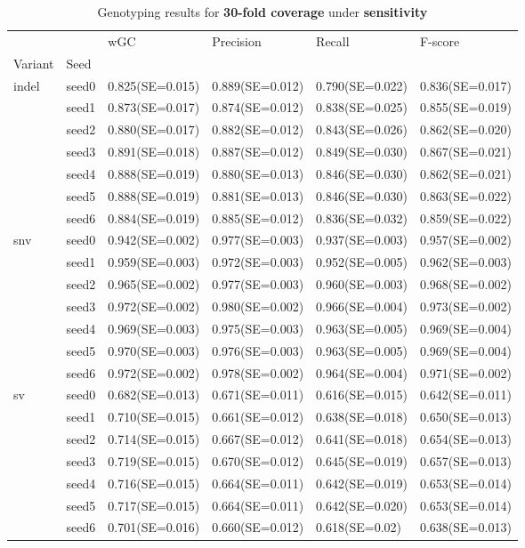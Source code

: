 \documentclass{PHlab-thesis}
\begin{document}
\begin{table}[ht!]
\begin{tabular*}{\textwidth}{@{\extracolsep{\fill}}llllll@{\extracolsep{\fill}}}
\toprule
   &         &               wGC &         Precision &            Recall &           F-score \\
Variant & Seed &                   &                   &                   &                   \\
\midrule
indel & seed0  & 0.825(SE=0.015) & 0.889(SE=0.012) & 0.790(SE=0.022)&0.836(SE=0.017) \\
   & seed1 &0.873(SE=0.017) & 0.874(SE=0.012)&0.838(SE=0.025)&0.855(SE=0.019)\\
   & seed2 & 0.880(SE=0.017) & 0.882(SE=0.012)&0.843(SE=0.026) & 0.862(SE=0.020)\\
   & seed3 & 0.891(SE=0.018) & 0.887(SE=0.012)&0.849(SE=0.030) & 0.867(SE=0.021)\\
   & seed4 &  0.888(SE=0.019) & 0.880(SE=0.013) & 0.846(SE=0.030) & 0.862(SE=0.021)\\
   & seed5 & 0.888(SE=0.019)&  0.881(SE=0.013)&  0.846(SE=0.030)&  0.863(SE=0.022)\\
   & seed6 & 0.884(SE=0.019)&  0.885(SE=0.012)&  0.836(SE=0.032)&  0.859(SE=0.022)\\
\midrule
snv & seed0 & 0.942(SE=0.002)  & 0.977(SE=0.003)   & 0.937(SE=0.003)  & 0.957(SE=0.002) \\
   & seed1 & 0.959(SE=0.003)& 0.972(SE=0.003)&0.952(SE=0.005)& 0.962(SE=0.003)\\
   & seed2 & 0.965(SE=0.002) & 0.977(SE=0.003)& 0.960(SE=0.003)& 0.968(SE=0.002)\\
   & seed3 & 0.972(SE=0.002) & 0.980(SE=0.002)& 0.966(SE=0.004) & 0.973(SE=0.002)\\
   & seed4 & 0.969(SE=0.003) & 0.975(SE=0.003) & 0.963(SE=0.005) & 0.969(SE=0.004)\\
   & seed5 & 0.970(SE=0.003)&  0.976(SE=0.003)&  0.963(SE=0.005) & 0.969(SE=0.004)\\
   & seed6 & 0.972(SE=0.002)&  0.978(SE=0.002) &  0.964(SE=0.004)&  0.971(SE=0.002)\\
\midrule
sv & seed0  & 0.682(SE=0.013)  & 0.671(SE=0.011)  & 0.616(SE=0.015)  & 0.642(SE=0.011) \\
   & seed1 & 0.710(SE=0.015) & 0.661(SE=0.012) & 0.638(SE=0.018)& 0.650(SE=0.013)\\
   & seed2 & 0.714(SE=0.015) & 0.667(SE=0.012) & 0.641(SE=0.018)&0.654(SE=0.013)\\
   & seed3 & 0.719(SE=0.015) & 0.670(SE=0.012)& 0.645(SE=0.019) & 0.657(SE=0.013)\\
   & seed4 & 0.716(SE=0.015)&  0.664(SE=0.011)&  0.642(SE=0.019)&  0.653(SE=0.014)\\
   & seed5 &  0.717(SE=0.015)&  0.664(SE=0.011)&  0.642(SE=0.020)&  0.653(SE=0.014)\\
   & seed6 & 0.701(SE=0.016) &   0.660(SE=0.012)&  0.618(SE=0.02) & 0.638(SE=0.013)\\
\bottomrule
\end{tabular*}
\caption{Genotyping results for \textbf{30-fold coverage } under \textbf{sensitivity}\label{table:sensitivity-30x}}
\end{table}
\end{document}

